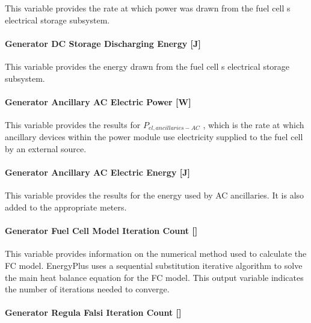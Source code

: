 This variable provides the rate at which power was drawn from the fuel cell s electrical storage subsystem.

\paragraph{Generator DC Storage Discharging Energy {[}J{]}}\label{generator-dc-storage-discharging-energy-j}

This variable provides the energy drawn from the fuel cell s electrical storage subsystem.

\paragraph{Generator Ancillary AC Electric Power {[}W{]}}\label{generator-ancillary-ac-electric-power-w}

This variable provides the results for \({P_{el,ancillaries - AC}}\) , which is the rate at which ancillary devices within the power module use electricity supplied to the fuel cell by an external source.

\paragraph{Generator Ancillary AC Electric Energy {[}J{]}}\label{generator-ancillary-ac-electric-energy-j}

This variable provides the results for the energy used by AC ancillaries. It is also added to the appropriate meters.

\paragraph{\texorpdfstring{Generator Fuel Cell Model Iteration Count {[]}}{Generator Fuel Cell Model Iteration Count }}\label{generator-fuel-cell-model-iteration-count}

This variable provides information on the numerical method used to calculate the FC model. EnergyPlus uses a sequential substitution iterative algorithm to solve the main heat balance equation for the FC model. This output variable indicates the number of iterations needed to converge.

\paragraph{\texorpdfstring{Generator Regula Falsi Iteration Count {[]}}{Generator Regula Falsi Iteration Count }}\label{generator-regula-falsi-iteration-count}

